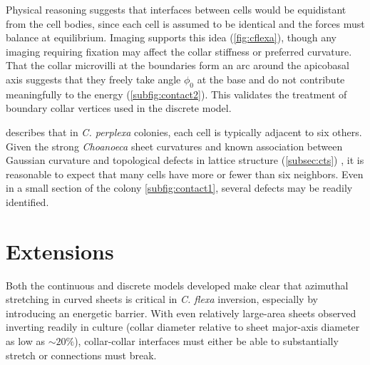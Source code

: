Physical reasoning suggests that interfaces between cells would be equidistant from the cell bodies, since each cell is assumed to be identical and the forces must balance at equilibrium. 
Imaging supports this idea (\cref{fig:cflexa}), though any imaging requiring fixation may affect the collar stiffness or preferred curvature.
That the collar microvilli at the boundaries form an arc around the apicobasal axis suggests that they freely take angle $\phi_0$ at the base and do not contribute meaningfully to the energy (\cref{subfig:contact2}). 
This validates the treatment of boundary collar vertices used in the discrete model.

\citet{leadbeater1983} describes that in \textit{C. perplexa} colonies, each cell is typically adjacent to six others. 
Given the strong \textit{Choanoeca} sheet curvatures and known association between Gaussian curvature and topological defects in lattice structure (\cref{subsec:cts}) \citep{sachdev1984,seung1988}, it is reasonable to expect that many cells have more or fewer than six neighbors.
Even in a small section of the colony \cref{subfig:contact1}, several defects may be readily identified.

\section{Extensions}

Both the continuous and discrete models developed make clear that azimuthal stretching in curved sheets is critical in \textit{C. flexa} inversion, especially by introducing an energetic barrier.
With even relatively large-area sheets observed inverting readily in culture (collar diameter relative to sheet major-axis diameter as low as $\sim20\%$), collar-collar interfaces must either be able to substantially stretch or connections must break.

